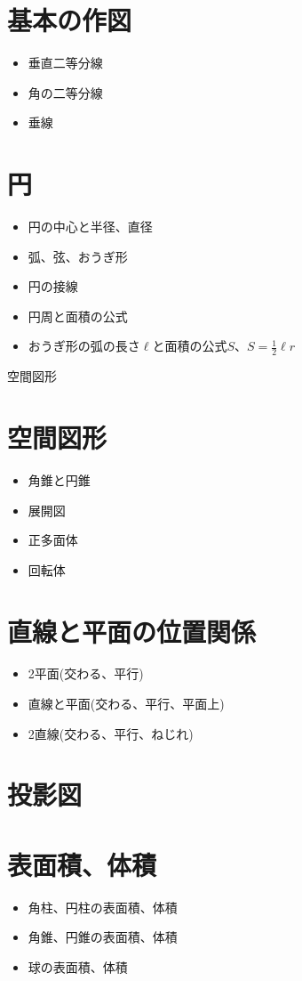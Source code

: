 \documentclass[11pt]{article}
\begin{document}
\section{基本の作図}
\begin{itemize}
\item 垂直二等分線
\item 角の二等分線
\item 垂線
\end{itemize}

\section{円}
\begin{itemize}
\item 円の中心と半径、直径
\item 弧、弦、おうぎ形
\item 円の接線
\item 円周と面積の公式
\item おうぎ形の弧の長さ$\ell$と面積の公式$S$、$S=\frac{1}{2} \ell r$
\end{itemize}

\newpage

{\LARGE \noindent 空間図形}
\section{空間図形}
\begin{itemize}
\item 角錐と円錐
\item 展開図
\item 正多面体
\item 回転体
\end{itemize}

\section{直線と平面の位置関係}
\begin{itemize}
\item 2平面(交わる、平行)
\item 直線と平面(交わる、平行、平面上)
\item 2直線(交わる、平行、ねじれ)
\end{itemize}

\section{投影図}

\section{表面積、体積}
\begin{itemize}
\item 角柱、円柱の表面積、体積
\item 角錐、円錐の表面積、体積
\item 球の表面積、体積
\end{itemize}
\end{document}
